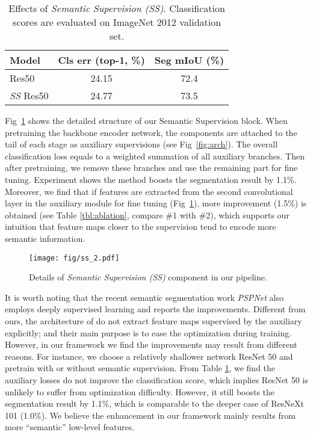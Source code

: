 \documentclass[runningheads]{llncs}
\begin{document}
\begin{table}
\begin{center}
\begin{tabular}{l|c|c}
\hline
Model & Cls err (top-1, \%) & Seg mIoU (\%) \\
\hline Res50 & 24.15 & 72.4 \\
\hline
\emph{SS} Res50 & 24.77 & 73.5\\
\hline
\end{tabular}
\end{center}

\caption{Effects of \emph{Semantic Supervision (SS)}. Classification scores are evaluated on ImageNet 2012 validation set.}

\label{tbl:semanticsup}
\end{table}


Fig~\ref{fig:semanticsupervision} shows the detailed structure of our Semantic Supervision block. When pretraining the backbone encoder network, the components are attached to the tail of each stage as auxiliary supervisions (see Fig~\ref{fig:arch}). The overall classification loss equals to a weighted summation of all auxiliary branches. Then after pretraining, we remove these branches and use the remaining part for fine tuning. Experiment shows the method boosts the segmentation result by 1.1\%. Moreover, we find that if features are extracted from the second convolutional layer in the auxiliary module for fine tuning (Fig~\ref{fig:semanticsupervision}), more improvement (1.5\%) is obtained (see Table \ref{tbl:ablation}, compare \#1 with \#2), which supports our intuition that feature maps closer to the supervision tend to encode more semantic information.

\begin{figure}
	\centering
	\texttt{[image: fig/ss\_2.pdf]}
	\caption{Details of \emph{Semantic Supervision (SS)} component in our pipeline.}
	\label{fig:semanticsupervision}
\end{figure}

It is worth noting that the recent semantic segmentation work \emph{PSPNet} \cite{Zhao2016Pyramid} also employs deeply supervised learning and reports the improvements. Different from ours, the architecture of \cite{Zhao2016Pyramid} do not extract feature maps supervised by the auxiliary explicitly; and their main purpose is to ease the optimization during training. However, in our framework we find the improvements may result from different reasons. For instance, we choose a relatively shallower network ResNet 50 \cite{He2016Deep} and pretrain with or without semantic supervision. From Table \ref{tbl:semanticsup}, we find the auxiliary losses do not improve the classification score, which implies ResNet 50 is unlikely to suffer from optimization difficulty. However, it still boosts the segmentation result by 1.1\%, which is comparable to the deeper case of ResNeXt 101 (1.0\%). We believe the enhancement in our framework mainly results from more ``semantic'' low-level features. 
\end{document}

